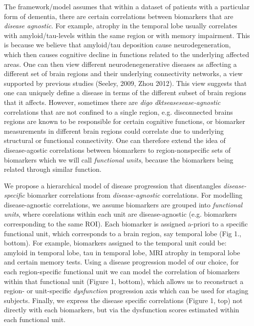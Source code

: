 \documentclass{llncs}
\begin{document}
The framework/model assumes that within a dataset of patients with a particular form of dementia, there are certain correlations between biomarkers that are \emph{disease agnostic}. For example, atrophy in the temporal lobe usually correlates with amyloid/tau-levels within the same region or with memory impairment. This is because we believe that amyloid/tau deposition cause neurodegeneration, which then causes cognitive decline in functions related to the underlying affected areas. One can then view different neurodenegenerative diseases as affecting a different set of brain regions and their underlying connectivity networks, a view supported by previous studies (Seeley, 2009, Zhou 2012). This view suggests that one can uniquely define a disease in terms of the different subset of brain regions that it affects. However, sometimes there are \emph{digo dktseasesease-agnostic} correlations that are not confined to a single region, e.g. disconnected brains regions are known to be responsible for certain cognitive functions, or biomarker measurements in different brain regions could correlate due to underlying structural or functional connectivity. One can therefore extend the idea of disease-agostic correlations between biomarkers to region-nonspecific sets of biomarkers which we will call \emph{functional units}, because the biomarkers being related through similar function.

We propose a hierarchical model of disease progression that disentangles \emph{disease-specific} biomarker correlations from \emph{disease-agnostic} correlations. For modelling disease-agnostic correlations, we assume biomarkers are grouped into \emph{functional units}, where corelations within each unit are disease-agnostic (e.g. biomarkers corresponding to the same ROI).  Each biomarker is assigned a-priori to a specific functional unit, which corresponds to a brain region, say temporal lobe (Fig 1., bottom).  For example, biomarkers assigned to the temporal unit could be: amyloid in temporal lobe, tau in temporal lobe, MRI atrophy in temporal lobe and certain memory tests. Using a disease progression model of our choice, for each region-specific functional unit we can model the correlation of biomarkers within that functional unit (Figure 1, bottom), which allows us to reconstruct a region- or unit-specific \emph{dysfunction} progression axis which can be used for staging subjects. Finally, we express the disease specific correlations (Figure 1, top) not directly with each biomarkers, but via the dysfunction scores estimated within each functional unit.  
\end{document}
